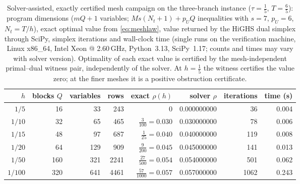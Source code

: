 \documentclass[11pt,a4paper]{article}
\theoremstyle{plain}
\theoremstyle{definition}
\theoremstyle{remark}
\newcommand{\tfr}[2]{\tfrac{#1}{#2}}
\begin{document}
\begin{table}[t]
\centering\small
\caption{Solver-assisted, exactly certified mesh campaign on the three-branch instance ($\tau=\tfr15$, $T=\tfr65$): program dimensions ($mQ+1$ variables; $Ms(N_t{+}1)+p_UQ$ inequalities with $s=7$, $p_U=6$, $N_t=T/h$), exact optimal value from \eqref{eq:meshlaw}, value returned by the HiGHS dual simplex \cite{HuangfuHall2018} through SciPy, simplex iterations and wall-clock time (single runs on the verification machine, Linux x86\_64, Intel Xeon @ 2.60\,GHz, Python~3.13, SciPy~1.17; counts and times may vary with solver version). Optimality of each exact value is certified by the mesh-independent primal--dual witness pair, independently of the solver. At $h=\tfr15$ the witness certifies the value zero; at the finer meshes it is a positive obstruction certificate.}
\label{tab:mesh}
\begin{tabular}{@{}rrrrrrrr@{}}
\toprule
$h$ & blocks $Q$ & variables & rows & exact $\rho(h)$ & solver $\rho$ & iterations & time (s)\\
\midrule
$1/5$   & 16  & 33  & 243  & $0$                    & 0.000000000 & 36   & 0.004\\
$1/10$  & 32  & 65  & 465  & $\tfr{3}{100}=0.030$   & 0.030000000 & 78   & 0.006\\
$1/15$  & 48  & 97  & 687  & $\tfr{1}{25}=0.040$    & 0.040000000 & 119  & 0.008\\
$1/20$  & 64  & 129 & 909  & $\tfr{9}{200}=0.045$   & 0.045000000 & 141  & 0.013\\
$1/50$  & 160 & 321 & 2241 & $\tfr{27}{500}=0.054$  & 0.054000000 & 501  & 0.062\\
$1/100$ & 320 & 641 & 4461 & $\tfr{57}{1000}=0.057$ & 0.057000000 & 1062 & 0.243\\
\bottomrule
\end{tabular}
\end{table}
\end{document}
